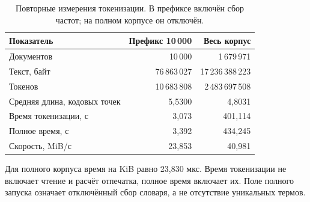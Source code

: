 \begin{table}[H]\centering
\begin{tabular}{lrr}\toprule
Показатель & Префикс 10\,000 & Весь корпус\\\midrule
Документов & 10\,000 & 1\,679\,971\\
Текст, байт & 76\,863\,027 & 17\,236\,388\,223\\
Токенов & 10\,683\,808 & 2\,483\,697\,508\\
Средняя длина, кодовых точек & 5,5300 & 4,8031\\
Время токенизации, с & 3,073 & 401,114\\
Полное время, с & 3,392 & 434,245\\
Скорость, MiB/с & 23,853 & 40,981\\
\bottomrule\end{tabular}
\caption{Повторные измерения токенизации. В префиксе включён сбор частот; на полном корпусе он отключён.}
\end{table}
Для полного корпуса время на KiB равно 23,830 мкс. Время
токенизации не включает чтение и расчёт отпечатка, полное время включает их.
Поле  полного запуска означает отключённый сбор словаря,
а не отсутствие уникальных термов.
